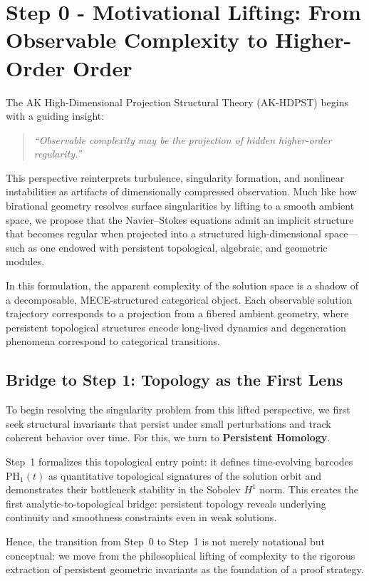 \documentclass[11pt]{article}
\theoremstyle{definition}
\begin{document}
\section{Step 0 - Motivational Lifting: From Observable Complexity to Higher-Order Order}

The AK High-Dimensional Projection Structural Theory (AK-HDPST) begins with a guiding insight:

\begin{quote}
\textit{“Observable complexity may be the projection of hidden higher-order regularity.”}
\end{quote}

This perspective reinterprets turbulence, singularity formation, and nonlinear instabilities as artifacts of dimensionally compressed observation. Much like how birational geometry resolves surface singularities by lifting to a smooth ambient space, we propose that the Navier–Stokes equations admit an implicit structure that becomes regular when projected into a structured high-dimensional space—such as one endowed with persistent topological, algebraic, and geometric modules.

In this formulation, the apparent complexity of the solution space is a shadow of a decomposable, MECE-structured categorical object. Each observable solution trajectory corresponds to a projection from a fibered ambient geometry, where persistent topological structures encode long-lived dynamics and degeneration phenomena correspond to categorical transitions.

\subsection*{Bridge to Step 1: Topology as the First Lens}

To begin resolving the singularity problem from this lifted perspective, we first seek structural invariants that persist under small perturbations and track coherent behavior over time. For this, we turn to \textbf{Persistent Homology}.

Step~1 formalizes this topological entry point: it defines time-evolving barcodes $\mathrm{PH}_1(t)$ as quantitative topological signatures of the solution orbit and demonstrates their bottleneck stability in the Sobolev $H^1$ norm. This creates the first analytic-to-topological bridge: persistent topology reveals underlying continuity and smoothness constraints even in weak solutions.

Hence, the transition from Step~0 to Step~1 is not merely notational but conceptual: we move from the philosophical lifting of complexity to the rigorous extraction of persistent geometric invariants as the foundation of a proof strategy.
\end{document}
